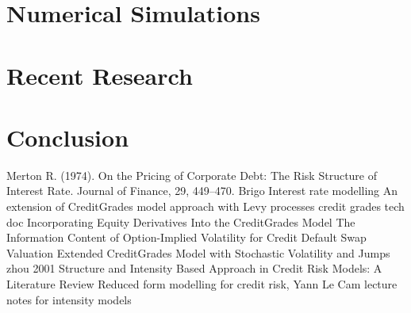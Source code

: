 \documentclass[11t,a4paper]{article}
\begin{document}
\section{Numerical Simulations}
\section{Recent Research}
\section{Conclusion}
\newpage
\begin{thebibliography}{1}
Merton R. (1974).  On the Pricing of Corporate Debt: The Risk Structure of Interest Rate. Journal of Finance, 29, 449–470.
Brigo Interest rate modelling
An extension of CreditGrades model approach with Levy processes
credit grades tech doc
Incorporating Equity Derivatives Into the CreditGrades Model
The Information Content of Option-Implied Volatility for Credit Default Swap Valuation
Extended CreditGrades Model with Stochastic Volatility and Jumps
zhou 2001
Structure and Intensity Based Approach in Credit Risk Models: A Literature Review
Reduced form modelling for credit risk, Yann Le Cam
lecture notes for intensity models
\end{thebibliography}
\end{document}
